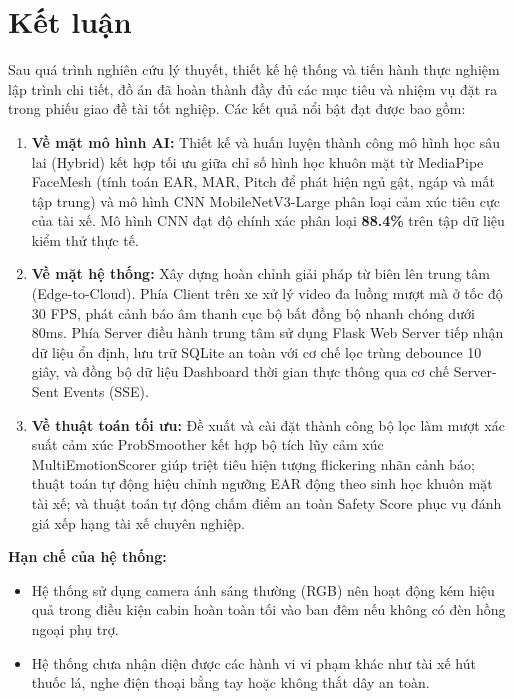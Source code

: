 \documentclass[../DoAn.tex]{subfiles}
\begin{document}
\section{Kết luận}
\label{section:6.1}
Sau quá trình nghiên cứu lý thuyết, thiết kế hệ thống và tiến hành thực nghiệm lập trình chi tiết, đồ án đã hoàn thành đầy đủ các mục tiêu và nhiệm vụ đặt ra trong phiếu giao đề tài tốt nghiệp. Các kết quả nổi bật đạt được bao gồm:
\begin{enumerate}
    \item \textbf{Về mặt mô hình AI:} Thiết kế và huấn luyện thành công mô hình học sâu lai (Hybrid) kết hợp tối ưu giữa chỉ số hình học khuôn mặt từ MediaPipe FaceMesh (tính toán EAR, MAR, Pitch để phát hiện ngủ gật, ngáp và mất tập trung) và mô hình CNN MobileNetV3-Large phân loại cảm xúc tiêu cực của tài xế. Mô hình CNN đạt độ chính xác phân loại \textbf{88.4\%} trên tập dữ liệu kiểm thử thực tế.
    \item \textbf{Về mặt hệ thống:} Xây dựng hoàn chỉnh giải pháp từ biên lên trung tâm (Edge-to-Cloud). Phía Client trên xe xử lý video đa luồng mượt mà ở tốc độ 30 FPS, phát cảnh báo âm thanh cục bộ bất đồng bộ nhanh chóng dưới 80ms. Phía Server điều hành trung tâm sử dụng Flask Web Server tiếp nhận dữ liệu ổn định, lưu trữ SQLite an toàn với cơ chế lọc trùng debounce 10 giây, và đồng bộ dữ liệu Dashboard thời gian thực thông qua cơ chế Server-Sent Events (SSE).
    \item \textbf{Về thuật toán tối ưu:} Đề xuất và cài đặt thành công bộ lọc làm mượt xác suất cảm xúc ProbSmoother kết hợp bộ tích lũy cảm xúc MultiEmotionScorer giúp triệt tiêu hiện tượng flickering nhãn cảnh báo; thuật toán tự động hiệu chỉnh ngưỡng EAR động theo sinh học khuôn mặt tài xế; và thuật toán tự động chấm điểm an toàn Safety Score phục vụ đánh giá xếp hạng tài xế chuyên nghiệp.
\end{enumerate}

\noindent \textbf{Hạn chế của hệ thống:}
\begin{itemize}
    \item Hệ thống sử dụng camera ánh sáng thường (RGB) nên hoạt động kém hiệu quả trong điều kiện cabin hoàn toàn tối vào ban đêm nếu không có đèn hồng ngoại phụ trợ.
    \item Hệ thống chưa nhận diện được các hành vi vi phạm khác như tài xế hút thuốc lá, nghe điện thoại bằng tay hoặc không thắt dây an toàn.
\end{itemize}
\end{document}
